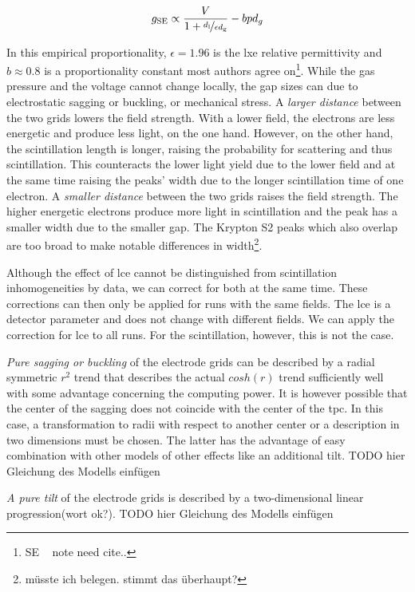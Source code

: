 \begin{equation}
    g_\mathrm{SE} \propto \frac{V}{1 + \nicefrac{d_\mathrm{l}}{\epsilon d_\mathrm{g}} }- bpd_g
\end{equation}

In this empirical proportionality, $ \epsilon = 1.96 $ is the \gls{lxe} relative permittivity and $ b \approx 0.8 $ is a proportionality constant most authors agree on\footnote{SE \oneton~ note need cite..}.  %
While the gas pressure and the voltage cannot change locally, the gap sizes can due to electrostatic sagging or buckling, or mechanical stress.
A \emph{larger distance} between the two grids lowers the field strength.
With a lower field, the electrons are less energetic and produce less light, on the one hand.
However, on the other hand, the scintillation length is longer, raising the probability for scattering and thus scintillation.
This counteracts the lower light yield due to the lower field and at the same time raising the peaks' width due to the longer scintillation time of one electron.
A \emph{smaller distance} between the two grids raises the field strength.
The higher energetic electrons produce more light in scintillation and the peak has a smaller width due to the smaller gap.
The Krypton S2 peaks which also overlap are too broad to make notable differences in width\footnote{müsste ich belegen. stimmt das überhaupt?}.

Although the effect of \gls{lce} cannot be distinguished from scintillation inhomogeneities by data, we can correct for both at the same time.
These corrections can then only be applied for runs with the same fields.
The \gls{lce} is a detector parameter and does not change with different fields.
We can apply the correction for \gls{lce} to all runs.
For the scintillation, however, this is not the case.




\emph{Pure sagging or buckling} of the electrode grids can be described by a radial symmetric $ r^2 $ trend that describes the actual $ cosh\left( r \right) $ trend sufficiently well with some advantage concerning the computing power.
It is however possible that the center of the sagging does not coincide with the center of the \gls{tpc}.
In this case, a transformation to radii with respect to another center or a description in two dimensions must be chosen.
The latter has the advantage of easy combination with other models of other effects like an additional tilt.
TODO hier Gleichung des Modells einfügen

\emph{A pure tilt} of the electrode grids is described by a two-dimensional linear progression(wort ok?).
TODO hier Gleichung des Modells einfügen

